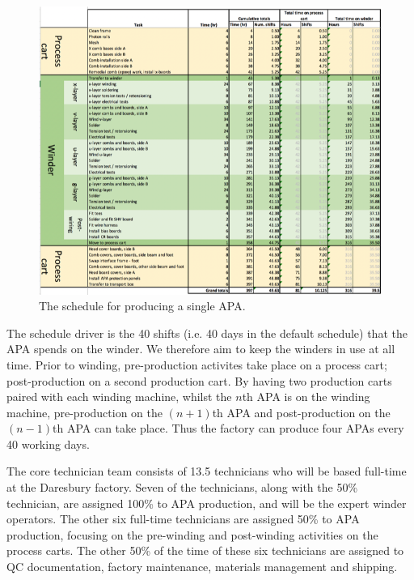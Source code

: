 \begin{figure}
    \centering
    \includegraphics[width=\textwidth]{figs/WP3/FactorySchedule.png}
    \caption{The schedule for producing a single APA.}
    \label{fig:FactorySchedule}
\end{figure}

The schedule driver is the 40 shifts (i.e. 40 days in the default schedule) that the APA spends on the winder. We therefore aim to keep the winders in use at all time. Prior to winding, pre-production activites take place on a process cart; post-production on a second production cart. By having two production carts paired with each winding machine, whilst the $n$th APA is on the winding machine, pre-production on the $(n+1)$th APA and post-production on the $(n-1)$th APA can take place. Thus the factory can produce four APAs every 40 working days.

The core technician team consists of 13.5 technicians who will be based full-time at the Daresbury factory. Seven of the technicians, along with the 50\% technician, are assigned 100\% to APA production, and will be the expert winder operators. The other six full-time technicians are assigned 50\% to APA production, focusing on the pre-winding and post-winding activities on the process carts. The other 50\% of the time of these six technicians are assigned to QC documentation, factory maintenance, materials management and shipping.


